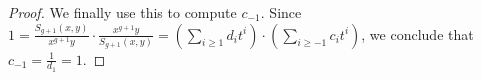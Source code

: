 \documentclass[draft, 11pt]{article} %
\theoremstyle{plain}
\theoremstyle{remark}
\begin{document}
\begin{proof}
We finally use this to compute $c_{-1}$.
Since $1 = \frac{S_{g+1}(x,y)}{x^{g+1}y}\cdot \frac{x^{g+1}y}{S_{g+1}(x,y)} = \left( \sum_{i\geq 1}d_it^i \right) \cdot \left( \sum_{i\geq -1}c_it^i\right)$, we conclude that $c_{-1} = \frac{1}{d_{1}} = 1$.




\end{proof}



\begin{comment}
We define $\alpha^i_j$ and $\Alpha^i_{j+1}$ for $0 \leq j \leq 2g$, and $B_k^i$ for $1\leq k \leq g$, such that
\[
$s_i(x) = \alpha^i_{2g}x^{2g} + \ldots + \alpha^i_0 \ {\rm and } \ S_i(x) = A_{2g+1}^ix^{2g+1} + \ldots + A^i_1 x + y(B_g^i x^i + \ldots + B_1^i x).
\]
\end{comment}






\end{document}
